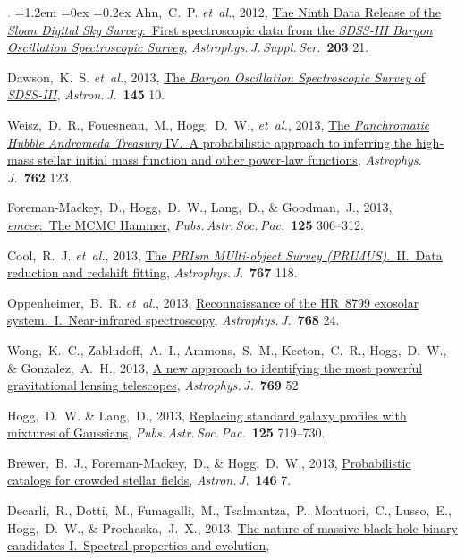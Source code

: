 \documentclass[10pt,letterpaper]{article}
\newcommand{\acronym}[1]{{\small{#1}}}
\newcommand{\foreign}[1]{\textsl{#1}}
\newcommand{\etal}{\foreign{et~al.}}
\newcommand{\project}[1]{\textsl{#1}}
\newcommand{\doi}[2]{\href{http://dx.doi.org/#1}{{#2}}}
\newcommand{\deemph}[1]{\textcolor{grey}{\footnotesize{#1}}}
\newcommand{\pubnumber}[1]{\deemph{{#1}.}}
\newcounter{refpubnum}
\newcommand{\hogglist}{%
    \rightmargin=0in
    \leftmargin=1.2em
    \topsep=0ex
    \partopsep=0pt
    \itemsep=0.2ex
    \parsep=0pt
    \itemindent=-1.0\leftmargin
    \listparindent=0.0\leftmargin
    \settowidth{\labelsep}{~}
    \usecounter{refpubnum}
  }
\begin{document}
\begin{list}{\pubnumber{\therefpubnum}}{\hogglist}
Ahn,~C.~P. \etal, 2012,
\doi{10.1088/0067-0049/203/2/21}{The Ninth Data Release of the \project{Sloan Digital Sky Survey}:\ First spectroscopic data from the \project{\acronym{SDSS-III} Baryon Oscillation Spectroscopic Survey}},
\textit{Astrophys.\,J.\,Suppl.\,Ser.}\ \textbf{203} 21.
\item
Dawson,~K.~S. \etal, 2013,
\doi{10.1088/0004-6256/145/1/10}{The \project{Baryon Oscillation Spectroscopic Survey} of \project{\acronym{SDSS-III}}},
\textit{Astron.\,J.}\ \textbf{145} 10.
\item
Weisz,~D.~R., Fouesneau,~M., Hogg,~D.~W., \etal, 2013,
\doi{10.1088/0004-637X/762/2/123}{The \project{Panchromatic Hubble Andromeda Treasury} \acronym{IV}.\ A probabilistic approach to inferring the high-mass stellar initial mass function and other power-law functions},
\textit{Astrophys.\,J.}\ \textbf{762} 123.
\item
Foreman-Mackey,~D., Hogg,~D.~W., Lang,~D., \& Goodman,~J., 2013,
\doi{10.1086/670067}{\project{emcee}:\ The MCMC Hammer},
\textit{Pubs.\,Astr.\,Soc.\,Pac.}\ \textbf{125} 306--312.
\item
Cool,~R.~J. \etal, 2013,
\doi{10.1088/0004-637X/767/2/118}{The \project{PRIsm MUlti-object Survey (\acronym{PRIMUS})}.\ \acronym{II}.\ Data reduction and redshift fitting},
\textit{Astrophys.\,J.}\ \textbf{767} 118.
\item
Oppenheimer,~B.~R. \etal, 2013,
\doi{10.1088/0004-637X/768/1/24}{Reconnaissance of the HR~8799 exosolar system.\ \acronym{I}.\ Near-infrared spectroscopy},
\textit{Astrophys.\,J.}\ \textbf{768} 24.
\item
Wong,~K.~C., Zabludoff,~A.~I., Ammons,~S.~M., Keeton,~C.~R., Hogg,~D.~W., \& Gonzalez,~A.~H., 2013,
\doi{10.1088/0004-637X/769/1/52}{A new approach to identifying the most powerful gravitational lensing telescopes},
\textit{Astrophys.\,J.}\ \textbf{769} 52.
\item
Hogg,~D.~W. \& Lang,~D., 2013,
\doi{10.1086/671228}{Replacing standard galaxy profiles with mixtures of Gaussians},
\textit{Pubs.\,Astr.\,Soc.\,Pac.}\ \textbf{125} 719--730.
\item
Brewer,~B.~J., Foreman-Mackey,~D., \& Hogg,~D.~W., 2013,
\doi{10.1088/0004-6256/146/1/7}{Probabilistic catalogs for crowded stellar fields},
\textit{Astron.\,J.}\ \textbf{146} 7.
\item
Decarli,~R., Dotti,~M., Fumagalli,~M., Tsalmantza,~P., Montuori,~C., Lusso,~E.,
Hogg,~D.~W., \& Prochaska,~J.~X., 2013,
\doi{10.1093/mnras/stt831}{The nature of massive black hole binary candidates \acronym{I}.\ Spectral properties and evolution},

\end{list}
\end{document}
